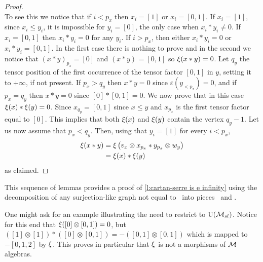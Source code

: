 \begin{proof}
\[	\]
	To see this we notice that if $i < p_x$ then $x_i = [1]$ or $x_i = [0,1]$.
	If $x_i = [1]$, since $x_i \leq y_i$, it is impossible for $y_i = [0]$, the only case when $x_i \ast y_i \neq 0$.
	If $x_i = [0,1]$ then $x_i \ast y_i = 0$ for any $y_i$.
	If $i > p_x$, then either $x_i \ast y_i = 0$ or $x_i \ast y_i = [0,1]$.
	In the first case there is nothing to prove and in the second we notice that $(x \ast y)_{p_x} = [0]$ and $(x \ast y)_{} = [0,1]$ so $\operatorname{\xi}(x \ast y) = 0$.
	Let $q_y$ the tensor position of the first occurrence of the tensor factor $[0,1]$ in $y$, setting it to $+\infty$, if not present.
	If $p_x > q_y$ then $x \ast y = 0$ since $\varepsilon(y_{<p_x}) = 0$, and if $p_x = q_y$ then $x \ast y = 0$ since $[0] \ast [0,1] = 0$.
	We now prove that in this case $\operatorname{\xi}(x) \ast \operatorname{\xi}(y) = 0$.
	Since $x_{q_y} = [0,1]$ since $x \leq y$ and $x_{p_x}$ is the first tensor factor equal to $[0]$.
	This implies that both $\operatorname{\xi}(x)$ and $\operatorname{\xi}(y)$ contain the vertex $q_{y} - 1$.
	Let us now assume that $p_x < q_y$.
	Then, using that $y_i = [1]$ for every $i < p_x$,
	\begin{align*}
	\operatorname{\xi}(x \ast y) & =
	\operatorname{\xi} \big( v_x \otimes x_{p_x} \ast y_{p_x} \otimes w_y \big) \\ & =
	\operatorname{\xi}(x) \ast \operatorname{\xi}(y)
	\end{align*}
	as claimed.
\end{proof}

This sequence of lemmas provides a proof of \cref{l:cartan-serre is e infinity} using the decomposition of any surjection-like graph not equal to \counit \ into pieces \coproduct \ and \product.

\begin{remark}
	One might ask for an example illustrating the need to restrict to ${\operatorname{U}(\mathcal{M}_{sl})}$.
	Notice for this end that $\operatorname{\xi}([0] \otimes [0,1]) = 0$, but $([1] \otimes [1]) \ast ([0] \otimes [0,1]) = -([0,1] \otimes [0,1])$ which is mapped to $-[0,1,2]$ by $\operatorname{\xi}$.
	This proves in particular that $\operatorname{\xi}$ is not a morphisms of $\mathcal{M}$ algebras.
\end{remark}